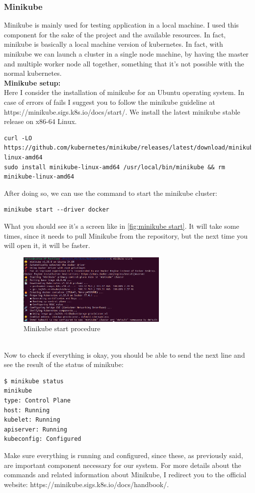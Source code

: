 \subsubsection{Minikube}
\label{subsec:minikube}
Minikube is mainly used for testing application in a local machine. I used this component for the sake of the project and the available resources. In fact, minikube is basically a local machine version of kubernetes. In fact, with minikube we can launch a cluster in a single node machine, by having the master and multiple worker node all together, something that it's not possible with the normal kubernetes.
\\[0.5em]
\noindent\textbf{Minikube setup:} 
\vspace{0.2em} \\
Here I consider the installation of minikube for an Ubuntu operating system. In case of errors of fails I suggest you to follow the minikube guideline at https://minikube.sigs.k8s.io/docs/start/. We install the latest minikube stable release on x86-64 Linux.
\begin{lstlisting}
curl -LO https://github.com/kubernetes/minikube/releases/latest/download/minikube-linux-amd64
sudo install minikube-linux-amd64 /usr/local/bin/minikube && rm minikube-linux-amd64
\end{lstlisting}
After doing so, we can use the command to start the minikube cluster:
\begin{lstlisting}[caption={Start minikube command line}]
% We want to specify to use Docker as container engine
minikube start --driver docker
\end{lstlisting}
What you should see it's a screen like in \autoref{fig:minikube start}. It will take some times, since it needs to pull Minikube from the repository, but the next time you will open it, it will be faster.
\begin{figure}[h!]
    \centering
    \includegraphics[width=0.65\textwidth]{images/minikube_start.png}
    \caption{Minikube start procedure}
    \label{fig:minikube start}
\end{figure} \\
Now to check if everything is okay, you should be able to send the next line and see the result of the status of minikube:
\begin{lstlisting}
$ minikube status
minikube
type: Control Plane
host: Running
kubelet: Running
apiserver: Running
kubeconfig: Configured
\end{lstlisting}
Make sure everything is running and configured, since these, as previously said, are important component necessary for our system. For more details about the commands and related information about Minikube, I redirect you to the official website: https://minikube.sigs.k8s.io/docs/handbook/.

